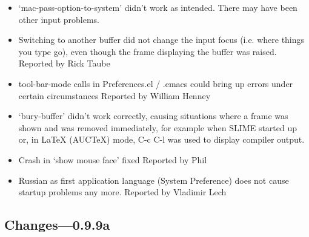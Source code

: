 \begin{itemize}
 
\item `mac-pass-option-to-system' didn't work as intended. There may
	have been other input problems.
	
\item Switching to another buffer did not change the input focus
 	(i.e. where things you type go), even though the frame displaying
	the buffer was raised.
	Reported by Rick Taube

\item tool-bar-mode calls in Preferences.el / .emacs could bring up
	errors under certain circumstances
	Reported by William Henney

\item `bury-buffer' didn't work correctly, causing situations where a
	frame was shown and was removed immediately, for example when
	SLIME started up or, in LaTeX (AUCTeX) mode, C-c C-l was used to
	display compiler output.

\item Crash in `show mouse face' fixed
	Reported by Phil
	
\item  Russian as first application language (System Preference) does
	not cause startup problems any more.
	Reported by Vladimir Lech

\end{itemize}



\subsection{Changes---0.9.9a}


